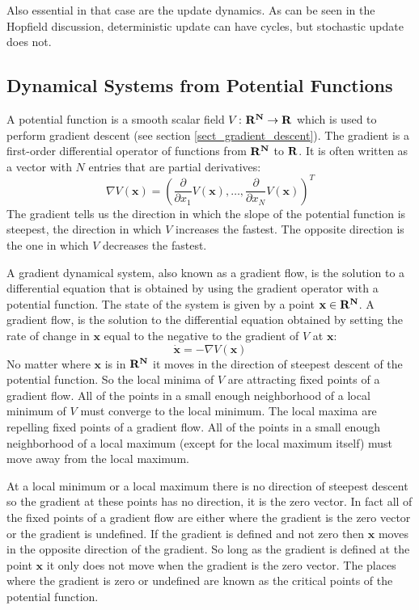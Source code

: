 Also essential in that case are the update dynamics. As can be seen in the Hopfield discussion, deterministic update can have cycles, but stochastic update does not.

\subsection{Dynamical Systems from Potential Functions}

   A potential function is a smooth scalar field $V \colon \bf{R}^N \to 
\bf{R}$ which is used to perform gradient descent (see section 
\ref{sect_gradient_descent}). The gradient is a first-order
differential operator of functions from $\bf{R}^N$ to $\bf{R}$.  It is often
written as a vector with $N$ entries that are partial derivatives:
\begin{equation*}
   \nabla V(\mathbf{x}) = \left( \dfrac{\partial}{\partial x_1} V(\mathbf{x}),
\ldots, \dfrac{\partial}{\partial x_N} V(\mathbf{x}) \right)^T
\end{equation*}
The gradient tells us the direction in which the slope of the potential 
function is steepest, the direction in which $V$ increases the fastest.  The 
opposite direction is the one in which $V$ decreases the fastest.  

   A gradient dynamical system, also known as a gradient flow, is the solution 
to a differential equation that is obtained by using the gradient operator with
a potential function.  The state of the system is given by a point $\mathbf{x} 
\in \bf{R}^N$.  A gradient flow, is the solution to the differential equation 
obtained by setting the rate of change in $\mathbf{x}$ equal to the negative to 
the gradient of $V$ at $\mathbf{x}$:
\begin{equation}
   \dot{\mathbf{x}} = -\nabla V(\mathbf{x}) 
\end{equation}
No matter where $\mathbf{x}$ is in $\bf{R}^N$ it moves in the direction of
steepest descent of the potential function.  So the local minima of $V$ are 
attracting fixed points of a gradient flow.  All of the points in a small 
enough neighborhood of a local minimum of $V$ must converge to the local 
minimum.  The local maxima are repelling fixed points of a gradient flow.  All 
of the points in a small enough neighborhood of a local maximum (except for 
the local maximum itself) must move away from the local maximum.  

   At a local minimum or a local maximum there is no direction of steepest
descent so the gradient at these points has no direction, it is the zero 
vector.  In fact all of the fixed points of a gradient flow are either where 
the gradient is the zero vector or the gradient is undefined.  If the gradient 
is defined and not zero then $\mathbf{x}$ moves in the opposite direction of 
the gradient.  So long as the gradient is defined at the point $\mathbf{x}$ it
only does not move when the gradient is the zero vector.  The places where the 
gradient is zero or undefined are known as the critical points of the potential 
function.

